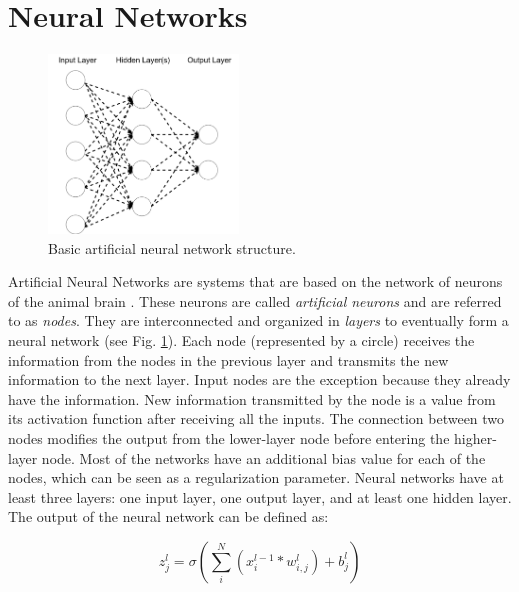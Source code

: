 \section{Neural Networks}\label{section:neural-networks}

\begin{figure}
    \centering
  \includegraphics[width=0.45\textwidth]{background/images/neural-network.png}
  \caption{Basic artificial neural network structure.}\label{fig:neural-network}
  \vspace{-16mm}
\end{figure}

Artificial Neural Networks are systems that are based on the network of neurons of the animal brain \cite{mcculloch1943logical}. These neurons are called \textit{artificial neurons} and are referred to as \textit{nodes}. They are interconnected and organized in \textit{layers} to eventually form a neural network (see Fig. \ref{fig:neural-network}). Each node (represented by a circle) receives the information from the nodes in the previous layer and transmits the new information to the next layer. Input nodes are the exception because they already have the information. New information transmitted by the node is a value from its activation function after receiving all the inputs. The connection between two nodes modifies the output from the lower-layer node before entering the higher-layer node. Most of the networks have an additional bias value for each of the nodes, which can be seen as a regularization parameter. Neural networks have at least three layers: one input layer, one output layer, and at least one hidden layer. The output of the neural network can be defined as:

\begin{equation}\label{eq:forward-pass}
    z^l_j = \sigma \left( \sum_{i}^N(x_i^{l-1} *w_{i,j}^l) + b^l_j \right)
\end{equation}


